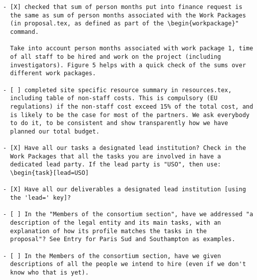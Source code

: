 \begin{draft}
\vspace{1cm}

\begin{verbatim}
- [X] checked that sum of person months put into finance request is
  the same as sum of person months associated with the Work Packages
  (in proposal.tex, as defined as part of the \begin{workpackage}"
  command.
  
  Take into account person months associated with work package 1, time
  of all staff to be hired and work on the project (including
  investigators). Figure 5 helps with a quick check of the sums over
  different work packages.

- [ ] completed site specific resource summary in resources.tex,
  including table of non-staff costs. This is compulsory (EU
  regulations) if the non-staff cost exceed 15% of the total cost, and
  is likely to be the case for most of the partners. We ask everybody
  to do it, to be consistent and show transparently how we have
  planned our total budget.

- [X] Have all our tasks a designated lead institution? Check in the
  Work Packages that all the tasks you are involved in have a
  dedicated lead party. If the lead party is "USO", then use:
  \begin{task}[lead=USO]

- [X] Have all our deliverables a designated lead institution [using
  the 'lead=' key]?

- [ ] In the "Members of the consortium section", have we addressed "a
  description of the legal entity and its main tasks, with an
  explanation of how its profile matches the tasks in the
  proposal"? See Entry for Paris Sud and Southampton as examples.

- [ ] In the Members of the consortium section, have we given
  descriptions of all the people we intend to hire (even if we don't
  know who that is yet). 
\end{verbatim}
\end{draft}





